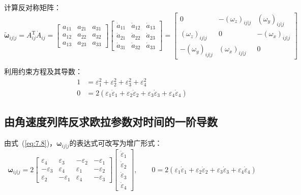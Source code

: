 计算反对称矩阵：
\begin{equation}
\tilde{\boldsymbol{\omega}}_{ij|j} = A_{ij}^{\mathrm{T}}\dot{A}_{ij}
=
\begin{bmatrix}
a_{11} & a_{21} & a_{31} \\ a_{12} & a_{22} & a_{32} \\ a_{13} & a_{23} & a_{33}
\end{bmatrix}
\begin{bmatrix}
\dot{a}_{11} & \dot{a}_{12} & \dot{a}_{13} \\ \dot{a}_{21} & \dot{a}_{22} & \dot{a}_{23} \\ \dot{a}_{31} & \dot{a}_{32} & \dot{a}_{33}
\end{bmatrix}
=
\begin{bmatrix}
0                & -(\omega_z)_{ij|j} & (\omega_y)_{ij|j}   \\[2pt]
(\omega_z)_{ij|j} & 0                 & -(\omega_x)_{ij|j}  \\[2pt]
-(\omega_y)_{ij|j}& (\omega_x)_{ij|j} & 0
\end{bmatrix}
\end{equation}

利用约束方程及其导数：
\begin{align}
1 &= \varepsilon_1^2 + \varepsilon_2^2 + \varepsilon_3^2 + \varepsilon_4^2 \\
0 &= 2(\varepsilon_1\dot{\varepsilon}_1 + \varepsilon_2\dot{\varepsilon}_2 + \varepsilon_3\dot{\varepsilon}_3 + \varepsilon_4\dot{\varepsilon}_4)
\end{align}

\subsection{由角速度列阵反求欧拉参数对时间的一阶导数}

由式~(\ref{eq:7.8})，$\boldsymbol{\omega}_{ij|j}$的表达式可改写为增广形式：
\begin{equation}
\boldsymbol{\omega}_{ij|j} = 2
\begin{bmatrix}
\varepsilon_4  & \varepsilon_3  & -\varepsilon_2 & -\varepsilon_1 \\[2pt]
-\varepsilon_3 & \varepsilon_4  & \varepsilon_1  & -\varepsilon_2 \\[2pt]
\varepsilon_2  & -\varepsilon_1 & \varepsilon_4  & -\varepsilon_3
\end{bmatrix}
\begin{bmatrix}
\dot{\varepsilon}_1 \\ \dot{\varepsilon}_2 \\ \dot{\varepsilon}_3 \\ \dot{\varepsilon}_4
\end{bmatrix},
\qquad
0 = 2(\varepsilon_1\dot{\varepsilon}_1 + \varepsilon_2\dot{\varepsilon}_2 + \varepsilon_3\dot{\varepsilon}_3 + \varepsilon_4\dot{\varepsilon}_4)
\end{equation}

